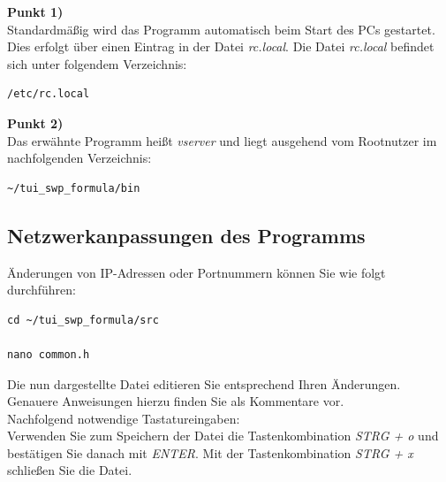 \documentclass[fontsize = 12pt, paper = a4]{scrreprt}
\begin{document}
\textbf{Punkt 1)} \\

Standardmäßig wird das Programm automatisch beim Start des PCs gestartet. Dies erfolgt über einen Eintrag in der Datei \textit{rc.local}.
Die Datei \textit{rc.local} befindet sich unter folgendem Verzeichnis:

\vspace*{4mm}
\begin{lstlisting}[frame=single]
/etc/rc.local
\end{lstlisting} 
\vspace*{-2mm}

\newpage

\textbf{Punkt 2)} \\

Das erwähnte Programm heißt \textit{vserver} und liegt ausgehend vom Rootnutzer im nachfolgenden Verzeichnis:

\vspace*{4mm}
\begin{lstlisting}[frame=single]
~/tui_swp_formula/bin
\end{lstlisting} 
\vspace*{-2mm}

\subsection{Netzwerkanpassungen des Programms}


Änderungen von IP-Adressen oder Portnummern können Sie wie folgt durchführen:

\vspace*{4mm}
\begin{lstlisting}[frame=single]
cd ~/tui_swp_formula/src

nano common.h
\end{lstlisting} 
\vspace*{-2mm}

Die nun dargestellte Datei editieren Sie entsprechend Ihren Änderungen. Genauere Anweisungen hierzu finden Sie als Kommentare vor.\\

Nachfolgend notwendige Tastatureingaben: \\

Verwenden Sie zum Speichern der Datei die Tastenkombination \textit{STRG + o} und bestätigen Sie danach mit \textit{ENTER}. Mit der Tastenkombination \textit{STRG + x} schließen Sie die Datei. 
\end{document}
